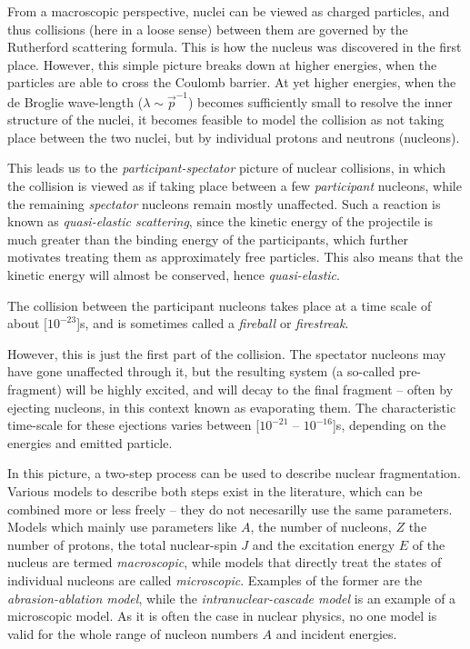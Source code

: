 From a macroscopic perspective, nuclei can be viewed as charged particles, and thus collisions (here in a loose sense) between them are governed by the Rutherford scattering formula.
This is how the nucleus was discovered in the first place. However, this simple picture breaks down at higher energies, when the particles are able to cross the Coulomb barrier.
At yet higher energies, when the de Broglie wave-length ($\lambda \sim \vec{p}^{-1}$) becomes sufficiently small to resolve the inner structure of the nuclei, it becomes feasible to model the collision as not taking place between the two nuclei, but by individual protons and neutrons (nucleons).

This leads us to the \emph{participant-spectator} picture of nuclear collisions, in which the collision is viewed as if taking place between a few \emph{participant} nucleons, while the remaining \emph{spectator} nucleons remain mostly unaffected. Such a reaction is known as \emph{quasi-elastic scattering}, since the kinetic energy of the projectile is much greater than the binding energy of the participants, which further motivates treating them as approximately free particles. This also means that the kinetic energy will almost be conserved, hence \emph{quasi-elastic}.

The collision between the participant nucleons takes place at a time scale of about \unit[$10^{-23}$]{s}\cite{gaimard:1991:art}, and is sometimes called a \emph{fireball} or \emph{firestreak}.

However, this is just the first part of the collision. The spectator nucleons may have gone unaffected through it, but the resulting system (a so-called pre-fragment) will be highly excited, and will decay to the final fragment -- often by ejecting nucleons, in this context known as evaporating them. The characteristic time-scale for these ejections varies between \unit[$10^{-21}$ -- $10^{-16}$]{s}, depending on the energies and emitted particle\cite{gaimard:1991:art}. 

In this picture, a two-step process can be used to describe nuclear fragmentation. 
Various models to describe both steps exist in the literature, which can be combined more or less freely -- they do not necesarilly use the same parameters. Models which mainly use parameters like $A$, the number of nucleons, $Z$ the number of protons, the total nuclear-spin $J$ and the excitation energy $E$ of the nucleus are termed \emph{macroscopic}, while models that directly treat the states of individual nucleons are called \emph{microscopic}. Examples of the former are the \emph{abrasion-ablation model}\cite{bowman:1973:book}, while the \emph{intranuclear-cascade model}\cite{metropolis:1991:art} is an example of a microscopic model. As it is often the case in nuclear physics, no one model is valid for the whole range of nucleon numbers $A$ and incident energies\cite{cucinotta:1998:art}.


